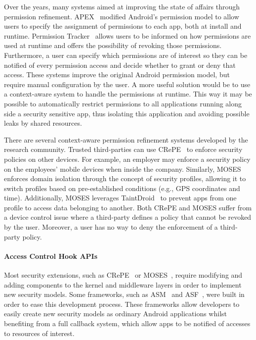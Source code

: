 Over the years, many systems aimed at improving the state of affairs through permission refinement. APEX~\cite{nauman2010apex} modified Android's permission model to allow users to specify the assignment of permissions to each app, both at install and runtime. Permission Tracker~\cite{kern2012permission} allows users to be informed on how permissions are used at runtime and offers the possibility of revoking those permissions. Furthermore, a user can specify which permissions are of interest so they can be notified of every permission access and decide whether to grant or deny that access. These systems improve the original Android permission model, but require manual configuration by the user. %
A more useful solution would be to use a context-aware system to handle the permissions at runtime. This way it may be possible to automatically restrict permissions to all applications running along side a security sensitive app, thus isolating this application and avoiding possible leaks by shared resources.

There are several context-aware permission refinement systems developed by the research community. Trusted third-parties can use CRePE~\cite{conti2011crepe} to enforce security policies on other devices. For example, an employer may enforce a security policy on the employees' mobile devices when inside the company. Similarly, MOSES~\cite{russello2012moses} enforces domain isolation through the concept of security profiles, allowing it to switch profiles based on pre-established conditions (e.g., GPS coordinates and time). Additionally, MOSES leverages TaintDroid~\cite{enck2014taintdroid} to prevent apps from one profile to access data belonging to another. Both CRePE and MOSES suffer from a device control issue where a third-party defines a policy that cannot be revoked by the user. Moreover, a user has no way to deny the enforcement of a third-party policy. 

\paragraph{\textbf{Access Control Hook APIs}}

Most security extensions, such as CRePE~\cite{conti2011crepe} or MOSES~\cite{russello2012moses}, require modifying and adding components to the kernel and middleware layers in order to implement new security models. Some frameworks, such as \ac{ASM}~\cite{heuser2014asm} and \ac{ASF}~\cite{backes2014android}, were built in order to ease this development process. These frameworks allow developers to easily create new security models as ordinary Android applications whilst benefiting from a full callback system, which allow apps to be notified of accesses to resources of interest.

